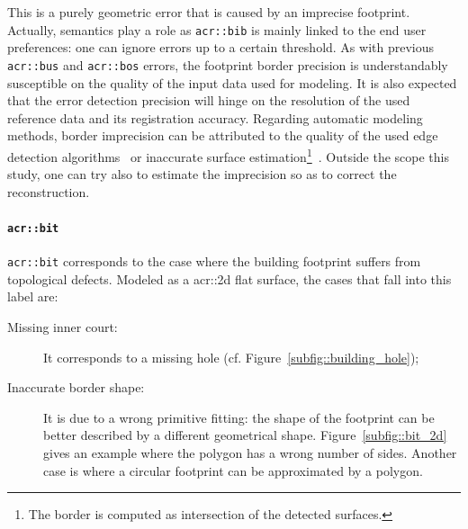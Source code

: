                 This is a purely geometric error that is caused by an imprecise footprint.
                Actually, semantics play a role as \texttt{\gls{acr::bib}} is mainly linked to the end user preferences: one can ignore errors up to a certain threshold. 
                As with previous \texttt{\gls{acr::bus}} and \texttt{\gls{acr::bos}} errors, the footprint border precision is understandably susceptible on the quality of the input data used for modeling.
                It is also expected that the error detection precision will hinge on the resolution of the used reference data and its registration accuracy.
                Regarding automatic modeling methods, border imprecision can be attributed to the quality of the used edge detection algorithms~\parencite{baillard1999automatic,werner2002new,nan2015template} or inaccurate surface estimation\footnote{
                    The border is computed as intersection of the detected surfaces.
                }~\parencite{durupt2006automatic,xiong2014graph}.
                Outside the scope this study, one can try also to estimate the imprecision so as to correct the reconstruction.

            \paragraph{\texttt{\acrlong*{acr::bit}}}
                \texttt{\gls{acr::bit}} corresponds to the case where the building footprint suffers from topological defects.
                Modeled as a \gls{acr::2d} flat surface, the cases that fall into this label are:
                \begin{description}
                    \item[Missing inner court:] It corresponds to a missing hole (cf. Figure~\ref{subfig::building_hole});
                    \item[Inaccurate border shape:] It is due to a wrong primitive fitting: the shape of the footprint can be better described by a different geometrical shape.
                            Figure~\ref{subfig::bit_2d} gives an example where the polygon has a wrong number of sides.
                            Another case is where a circular footprint can be approximated by a polygon.
                \end{description}

